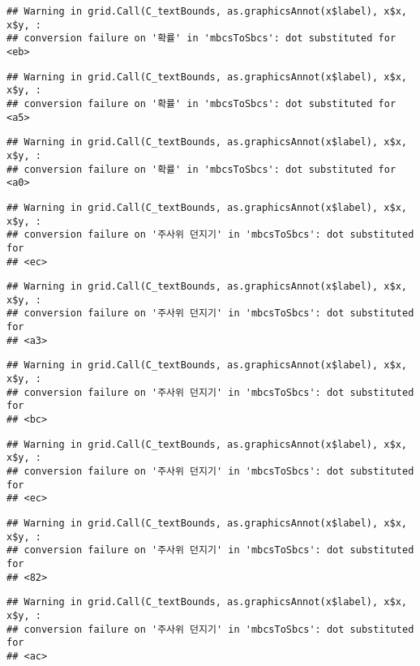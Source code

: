 \documentclass[]{book}
\begin{document}
\begin{verbatim}
## Warning in grid.Call(C_textBounds, as.graphicsAnnot(x$label), x$x, x$y, :
## conversion failure on '확률' in 'mbcsToSbcs': dot substituted for <eb>
\end{verbatim}

\begin{verbatim}
## Warning in grid.Call(C_textBounds, as.graphicsAnnot(x$label), x$x, x$y, :
## conversion failure on '확률' in 'mbcsToSbcs': dot substituted for <a5>
\end{verbatim}

\begin{verbatim}
## Warning in grid.Call(C_textBounds, as.graphicsAnnot(x$label), x$x, x$y, :
## conversion failure on '확률' in 'mbcsToSbcs': dot substituted for <a0>
\end{verbatim}

\begin{verbatim}
## Warning in grid.Call(C_textBounds, as.graphicsAnnot(x$label), x$x, x$y, :
## conversion failure on '주사위 던지기' in 'mbcsToSbcs': dot substituted for
## <ec>
\end{verbatim}

\begin{verbatim}
## Warning in grid.Call(C_textBounds, as.graphicsAnnot(x$label), x$x, x$y, :
## conversion failure on '주사위 던지기' in 'mbcsToSbcs': dot substituted for
## <a3>
\end{verbatim}

\begin{verbatim}
## Warning in grid.Call(C_textBounds, as.graphicsAnnot(x$label), x$x, x$y, :
## conversion failure on '주사위 던지기' in 'mbcsToSbcs': dot substituted for
## <bc>
\end{verbatim}

\begin{verbatim}
## Warning in grid.Call(C_textBounds, as.graphicsAnnot(x$label), x$x, x$y, :
## conversion failure on '주사위 던지기' in 'mbcsToSbcs': dot substituted for
## <ec>
\end{verbatim}

\begin{verbatim}
## Warning in grid.Call(C_textBounds, as.graphicsAnnot(x$label), x$x, x$y, :
## conversion failure on '주사위 던지기' in 'mbcsToSbcs': dot substituted for
## <82>
\end{verbatim}

\begin{verbatim}
## Warning in grid.Call(C_textBounds, as.graphicsAnnot(x$label), x$x, x$y, :
## conversion failure on '주사위 던지기' in 'mbcsToSbcs': dot substituted for
## <ac>
\end{verbatim}
\end{document}
